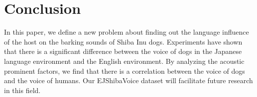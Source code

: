 \section{Conclusion}
\label{sec:conclusion}
In this paper, we define a new problem about finding out the language influence of the host on the barking sounds of Shiba Inu dogs. Experiments have shown that there is a significant difference between the voice of dogs in the Japanese language environment and the English environment. By analyzing the acoustic prominent factors, we find that there is a correlation between the voice of dogs and the voice of humans. Our EJShibaVoice dataset will facilitate future research in this field.